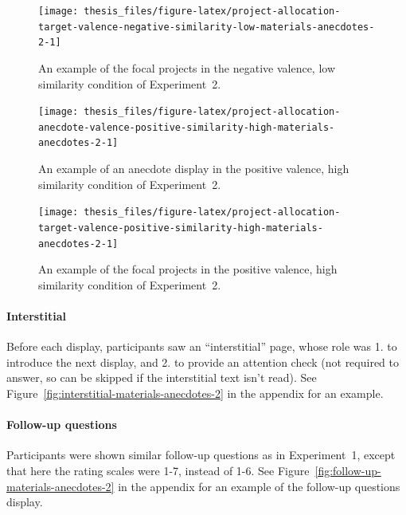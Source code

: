 \documentclass[a4paper, nobind, dvipsnames]{templates/ociamthesis}
\theoremstyle{definition}
\theoremstyle{definition}
\theoremstyle{definition}
\theoremstyle{definition}
\theoremstyle{remark}
\begin{document}
\begin{figure}
\texttt{[image: thesis\_files/figure-latex/project-allocation-target-valence-negative-similarity-low-materials-anecdotes-2-1]} \caption{An example of the focal projects in the negative valence, low similarity condition of Experiment~2.}\label{fig:project-allocation-target-valence-negative-similarity-low-materials-anecdotes-2}
\end{figure}



\begin{figure}
\texttt{[image: thesis\_files/figure-latex/project-allocation-anecdote-valence-positive-similarity-high-materials-anecdotes-2-1]} \caption{An example of an anecdote display in the positive valence, high similarity condition of Experiment~2.}\label{fig:project-allocation-anecdote-valence-positive-similarity-high-materials-anecdotes-2}
\end{figure}



\begin{figure}
\texttt{[image: thesis\_files/figure-latex/project-allocation-target-valence-positive-similarity-high-materials-anecdotes-2-1]} \caption{An example of the focal projects in the positive valence, high similarity condition of Experiment~2.}\label{fig:project-allocation-target-valence-positive-similarity-high-materials-anecdotes-2}
\end{figure}

\paragraph{Interstitial}

Before each display, participants saw an ``interstitial'' page, whose role was 1.
to introduce the next display, and 2. to provide an attention check (not
required to answer, so can be skipped if the interstitial text isn't read). See
Figure~\ref{fig:interstitial-materials-anecdotes-2} in the appendix for an
example.

\paragraph{Follow-up questions}

Participants were shown similar follow-up questions as in Experiment~1, except
that here the rating scales were 1-7, instead of 1-6. See
Figure~\ref{fig:follow-up-materials-anecdotes-2} in the appendix for an example
of the follow-up questions display.
\end{document}
